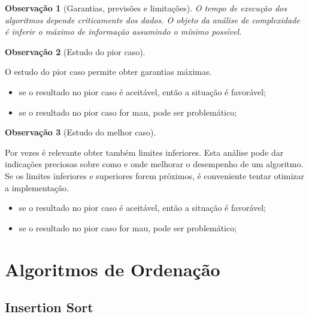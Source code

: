\documentclass[a4paper, 12pt]{article}
\newtheorem{remark}{Observação}
\begin{document}
\begin{remark}[Garantias, previsões e limitações]
    O tempo de execução dos algoritmos depende criticamente dos dados. O objeto da análise de complexidade é inferir o máximo de informação assumindo o mínimo possível.
\end{remark}

\begin{remark}[Estudo do pior caso]\end{remark}
    O estudo do pior caso permite obter garantias máximas.
    \begin{itemize}
        \item se o resultado no pior caso é aceitável, então a situação é favorável;
        \item se o resultado no pior caso for mau, pode ser problemático;
    \end{itemize}


\begin{remark}[Estudo do melhor caso]\end{remark}
    Por vezes é relevante obter também limites inferiores. Esta análise pode dar indicações preciosas sobre como e onde melhorar o
    desempenho de um algoritmo. Se os limites inferiores e superiores forem próximos, é conveniente tentar otimizar a implementação.
    \begin{itemize}
        \item se o resultado no pior caso é aceitável, então a situação é favorável;
        \item se o resultado no pior caso for mau, pode ser problemático;
    \end{itemize}

\newpage

\section{Algoritmos de Ordenação}

\subsection{Insertion Sort}
\end{document}
